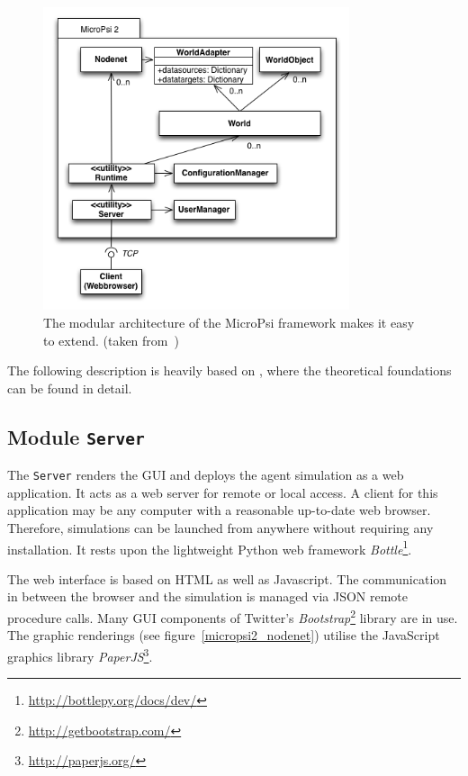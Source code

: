 \begin{figure}[h]
  \centering
    \includegraphics[width=9cm]{graphics/UML_MicroPsi_v14}
  \caption{The modular architecture of the MicroPsi framework makes it easy to extend. (taken from~\cite{conf/agi/Bach12})}
  \label{micropsi2_modules}
\end{figure}

The following description is heavily based on \cite{conf/agi/Bach12}, where the theoretical foundations can be found in detail.

        \subsection{Module \texttt{Server}}
The \texttt{Server} renders the GUI and deploys the agent simulation as a web application. It acts as a web server for remote or local access. A client for this application may be any computer with a reasonable up-to-date web browser. Therefore, simulations can be launched from anywhere without requiring any installation. It rests upon the lightweight Python web framework \emph{Bottle}\footnote{\url{http://bottlepy.org/docs/dev/}}.

The web interface is based on HTML as well as Javascript. The communication in between the browser and the simulation is managed via JSON remote procedure calls. Many GUI components of Twitter's \emph{Bootstrap}\footnote{\url{http://getbootstrap.com/}} library are in use. The graphic renderings (see figure~\ref{micropsi2_nodenet}) utilise the JavaScript graphics library \emph{PaperJS}\footnote{\url{http://paperjs.org/}}. 

